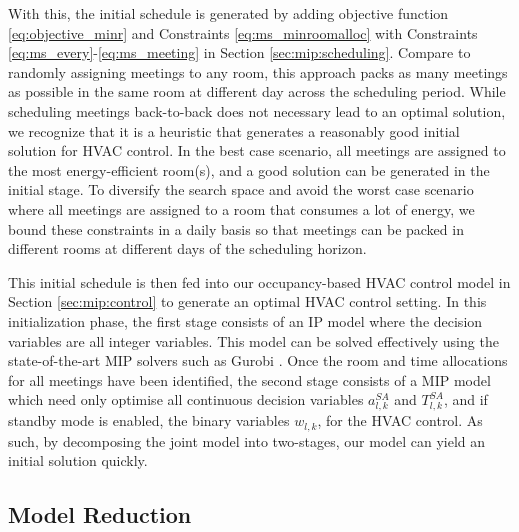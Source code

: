 
With this, the initial schedule is generated by adding objective function \eqref{eq:objective_minr} and Constraints \eqref{eq:ms_minroomalloc} with Constraints \eqref{eq:ms_every}-\eqref{eq:ms_meeting} in Section \ref{sec:mip:scheduling}. Compare to randomly assigning meetings to any room, this approach packs as many meetings as possible in the same room at different day across the scheduling period. While scheduling meetings back-to-back does not necessary lead to an optimal solution, we recognize that it is a heuristic that generates a reasonably good initial solution for HVAC control. In the best case scenario, all meetings are assigned to the most energy-efficient room(s), and a good solution can be generated in the initial stage. To diversify the search space and avoid the worst case scenario where all meetings are assigned to a room that consumes a lot of energy, we bound these constraints in a daily basis so that meetings can be packed in different rooms at different days of the scheduling horizon. 

This initial schedule is then fed into our occupancy-based HVAC control model in Section \ref{sec:mip:control} to generate an optimal HVAC control setting. In this initialization phase, the first stage consists of an IP model where the decision variables are all integer variables. This model can be solved effectively using the state-of-the-art MIP solvers such as Gurobi \citep{gurobi}. 
Once the room and time allocations for all meetings have been identified, the second stage consists of a MIP model which need only optimise all continuous decision variables $a^{SA}_{l,k}$ and $T^{SA}_{l,k}$, and if standby mode is enabled, the binary variables $w_{l,k}$, for the HVAC control. As such, by decomposing the joint model into two-stages, our model can yield an initial solution quickly. 


\subsection{Model Reduction}

